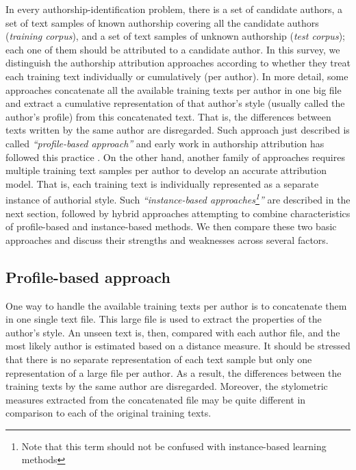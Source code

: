 In every authorship-identification problem, there is a set of candidate authors, a set of text samples of known authorship covering all the candidate authors (\textit{training corpus}), and a set of text samples of unknown authorship (\textit{test corpus}); each
one of them should be attributed to a candidate author. In this survey, we distinguish the authorship attribution approaches according to whether they treat each training text individually or cumulatively (per author). In more detail, some approaches concatenate all the available training texts per author in one big file and extract a cumulative representation of that author’s style (usually called the author’s profile) from
this concatenated text. That is, the differences between texts
written by the same author are disregarded. Such approach just described is called \textit{\enquote{profile-based approach}} and early work in authorship attribution has followed this practice \cite{mosteller2007inference}.
On the other hand, another family of approaches requires multiple training text samples per author to develop an accurate attribution model. That is, each training text is
individually represented as a separate instance of authorial style. Such \textit{\enquote{instance-based approaches\footnote{Note that this term should not be confused with instance-based learning methods\cite{mitchell1997artificial}}}} are described in the
next section, followed by hybrid approaches attempting to combine characteristics of profile-based and instance-based methods. We then compare these two basic approaches and
discuss their strengths and weaknesses across several factors.

\subsection{Profile-based approach}

One way to handle the available training texts per author is to concatenate them in one single text file. This large file is used to extract the properties of the author’s style. An unseen text is, then, compared with each author file, and the most likely author is estimated based on a distance measure. It should be stressed that there is no separate representation of each text sample but only one representation of a large file per author. As a result, the differences between the training texts by the same author are disregarded. Moreover, the stylometric measures extracted from the concatenated file may be quite
different in comparison to each of the original training texts.

